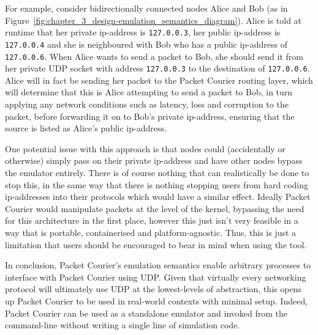 For example, consider bidirectionally connected nodes Alice and Bob (as in
Figure~\ref{fig:chapter_3_design-emulation_semantics_diagram}). Alice is told at runtime that her private ip-address is
\texttt{127.0.0.3}, her public ip-address is \texttt{127.0.0.4} and she is neighboured with Bob who has a public
ip-address of \texttt{127.0.0.6}. When Alice wants to send a packet to Bob, she should send it from her private UDP
socket with address \texttt{127.0.0.3} to the destination of \texttt{127.0.0.6}. Alice will in fact be sending her
packet to the Packet Courier routing layer, which will determine that this is Alice attempting to send a packet to
Bob, in turn applying any network conditions such as latency, loss and corruption to the packet, before forwarding it
on to Bob's private ip-address, ensuring that the source is listed as Alice's public ip-address.

One potential issue with this approach is that nodes could (accidentally or otherwise) simply pass on their private
ip-address and have other nodes bypass the emulator entirely. There is of course nothing that can realistically be
done to stop this, in the same way that there is nothing stopping users from hard coding ip-addresses into their
protocols which would have a similar effect. Ideally Packet Courier would manipulate packets at the level of the
kernel, bypassing the need for this architecture in the first place, however this just isn't very feasible in a way
that is portable, containerised and platform-agnostic. Thus, this is just a limitation that users should be
encouraged to bear in mind when using the tool.

In conclusion, Packet Courier's emulation semantics enable arbitrary processes to interface with Packet Courier
using UDP. Given that virtually every networking protocol will ultimately use UDP at the lowest-levels of
abstraction, this opens up Packet Courier to be used in real-world contexts with minimal setup. Indeed, Packet
Courier can be used as a standalone emulator and invoked from the command-line without writing a single line of
simulation code.
